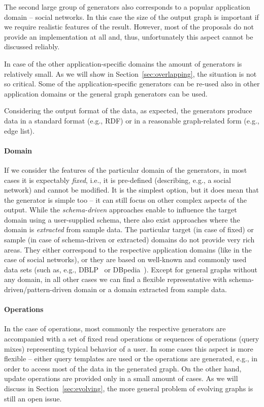 The second large group of generators also corresponds to a popular application domain -- social networks. In this case the size of the output graph is important if we require realistic features of the result. However, most of the proposals do not provide an implementation at all and, thus, unfortunately this aspect cannot be discussed reliably.

In case of the other application-specific domains the amount of generators is relatively small. As we will show in Section~\ref{sec:overlapping}, the situation is not so critical. Some of the application-specific generators can be re-used also in other application domains or the general graph generators can be used.

Considering the output format of the data, as expected, the generators produce data in a standard format (e.g., RDF) or in a reasonable graph-related form (e.g., edge list).

\paragraph{Domain}

If we consider the features of the particular domain of the generators, in most cases it is expectably \emph{fixed}, i.e., it is pre-defined (describing, e.g., a social network) and cannot be modified. It is the simplest option, but it does mean that the generator is simple too -- it can still focus on other complex aspects of the output. While the \emph{schema-driven} approaches enable to influence the target domain using a user-supplied schema, there also exist approaches where the domain is \emph{extracted} from sample data. The particular target (in case of fixed) or sample (in case of schema-driven or extracted) domains do not provide very rich areas. They either correspond to the respective application domains (like in the case of social networks), or they are based on well-known and commonly used data sets (such as, e.g., DBLP~\cite{dblp} or DBpedia~\cite{Bizer:2009:DCP:1640541.1640848}). Except for general graphs without any domain, in all other cases we can find a flexible representative with schema-driven/pattern-driven domain or a domain extracted from sample data.


\paragraph{Operations}
In the case of operations, most commonly the respective generators are accompanied with a set of fixed read operations or sequences of operations (query mixes) representing typical behavior of a user. In some cases this aspect is more flexible -- either query templates are used or the operations are generated, e.g., in order to access most of the data in the generated graph. On the other hand, update operations are provided only in a small amount of cases. As we will discuss in Section~\ref{sec:evolving}, the more general problem of evolving graphs is still an open issue.

